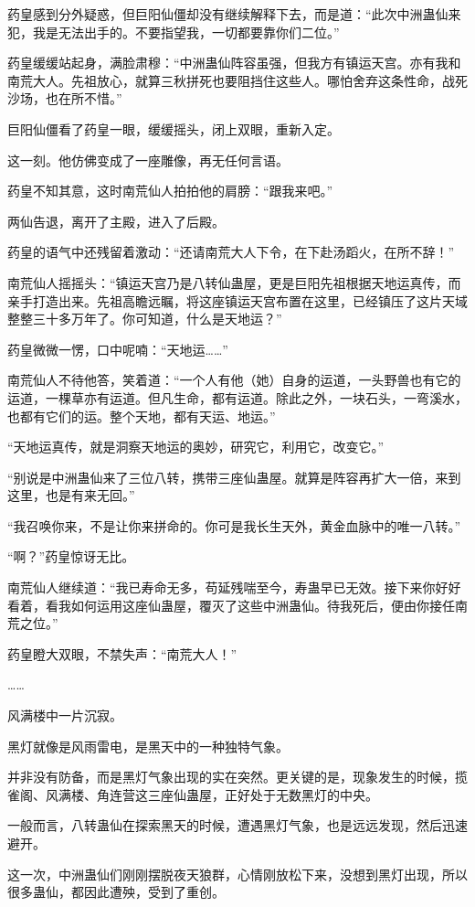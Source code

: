 \begin{this_body}
药皇感到分外疑惑，但巨阳仙僵却没有继续解释下去，而是道：“此次中洲蛊仙来犯，我是无法出手的。不要指望我，一切都要靠你们二位。”

药皇缓缓站起身，满脸肃穆：“中洲蛊仙阵容虽强，但我方有镇运天宫。亦有我和南荒大人。先祖放心，就算三秋拼死也要阻挡住这些人。哪怕舍弃这条性命，战死沙场，也在所不惜。”

巨阳仙僵看了药皇一眼，缓缓摇头，闭上双眼，重新入定。

这一刻。他仿佛变成了一座雕像，再无任何言语。

药皇不知其意，这时南荒仙人拍拍他的肩膀：“跟我来吧。”

两仙告退，离开了主殿，进入了后殿。

药皇的语气中还残留着激动：“还请南荒大人下令，在下赴汤蹈火，在所不辞！”

南荒仙人摇摇头：“镇运天宫乃是八转仙蛊屋，更是巨阳先祖根据天地运真传，而亲手打造出来。先祖高瞻远瞩，将这座镇运天宫布置在这里，已经镇压了这片天域整整三十多万年了。你可知道，什么是天地运？”

药皇微微一愣，口中呢喃：“天地运……”

南荒仙人不待他答，笑着道：“一个人有他（她）自身的运道，一头野兽也有它的运道，一棵草亦有运道。但凡生命，都有运道。除此之外，一块石头，一弯溪水，也都有它们的运。整个天地，都有天运、地运。”

“天地运真传，就是洞察天地运的奥妙，研究它，利用它，改变它。”

“别说是中洲蛊仙来了三位八转，携带三座仙蛊屋。就算是阵容再扩大一倍，来到这里，也是有来无回。”

“我召唤你来，不是让你来拼命的。你可是我长生天外，黄金血脉中的唯一八转。”

“啊？”药皇惊讶无比。

南荒仙人继续道：“我已寿命无多，苟延残喘至今，寿蛊早已无效。接下来你好好看着，看我如何运用这座仙蛊屋，覆灭了这些中洲蛊仙。待我死后，便由你接任南荒之位。”

药皇瞪大双眼，不禁失声：“南荒大人！”

……

风满楼中一片沉寂。

黑灯就像是风雨雷电，是黑天中的一种独特气象。

并非没有防备，而是黑灯气象出现的实在突然。更关键的是，现象发生的时候，揽雀阁、风满楼、角连营这三座仙蛊屋，正好处于无数黑灯的中央。

一般而言，八转蛊仙在探索黑天的时候，遭遇黑灯气象，也是远远发现，然后迅速避开。

这一次，中洲蛊仙们刚刚摆脱夜天狼群，心情刚放松下来，没想到黑灯出现，所以很多蛊仙，都因此遭殃，受到了重创。


\end{this_body}

